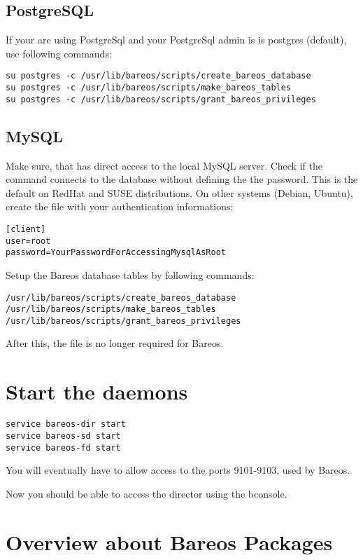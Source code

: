 \subsection{PostgreSQL}
If your are using PostgreSql and your PostgreSql admin is is postgres (default), use following commands:

\begin{verbatim}
su postgres -c /usr/lib/bareos/scripts/create_bareos_database
su postgres -c /usr/lib/bareos/scripts/make_bareos_tables
su postgres -c /usr/lib/bareos/scripts/grant_bareos_privileges
\end{verbatim}


\subsection{MySQL}
Make sure, that  has direct access to the local MySQL server. 
Check if the command  connects to the database without defining the the password. 
This is the default on RedHat and SUSE distributions. 
On other systems (Debian, Ubuntu),
create the file  with your authentication informations:
\begin{verbatim}
[client]
user=root
password=YourPasswordForAccessingMysqlAsRoot
\end{verbatim}

Setup the Bareos database tables by following commands:
\begin{verbatim}
/usr/lib/bareos/scripts/create_bareos_database
/usr/lib/bareos/scripts/make_bareos_tables
/usr/lib/bareos/scripts/grant_bareos_privileges
\end{verbatim}

After this, the file  is no longer required for Bareos.



\section{Start the daemons}
\begin{verbatim}
service bareos-dir start
service bareos-sd start
service bareos-fd start
\end{verbatim}

You will eventually have to allow access to the ports 9101-9103, used by Bareos.

Now you should be able to access the director using the bconsole.

\section{Overview about Bareos Packages}

